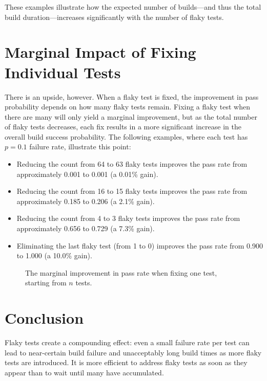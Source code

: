 \documentclass[letterpaper]{article}
\begin{document}
These examples illustrate how the expected number of builds—and thus the total build duration—increases significantly with the number of flaky tests.

\section*{Marginal Impact of Fixing Individual Tests}

There is an upside, however. When a flaky test is fixed, the improvement in pass probability depends on how many flaky tests remain. Fixing a flaky test when there are many will only yield a marginal improvement, but as the total number of flaky tests decreases, each fix results in a more significant increase in the overall build success probability. The following examples, where each test has \( p = 0.1 \) failure rate, illustrate this point:

\begin{itemize}
    \item Reducing the count from 64 to 63 flaky tests improves the pass rate from approximately 0.001 to 0.001 (a 0.01\% gain).
    \item Reducing the count from 16 to 15 flaky tests improves the pass rate from approximately 0.185 to 0.206 (a 2.1\% gain).
    \item Reducing the count from 4 to 3 flaky tests improves the pass rate from approximately 0.656 to 0.729 (a 7.3\% gain).
    \item Eliminating the last flaky test (from 1 to 0) improves the pass rate from 0.900 to 1.000 (a 10.0\% gain).
\end{itemize}

\begin{figure}[ht!]
    \centering
    \caption{The marginal improvement in pass rate when fixing one test, starting from \( n \) tests.}
\end{figure}

\section*{Conclusion}

Flaky tests create a compounding effect: even a small failure rate per test can lead to near-certain build failure and unacceptably long build times as more flaky tests are introduced. It is more efficient to address flaky tests as soon as they appear than to wait until many have accumulated. 
\end{document}
